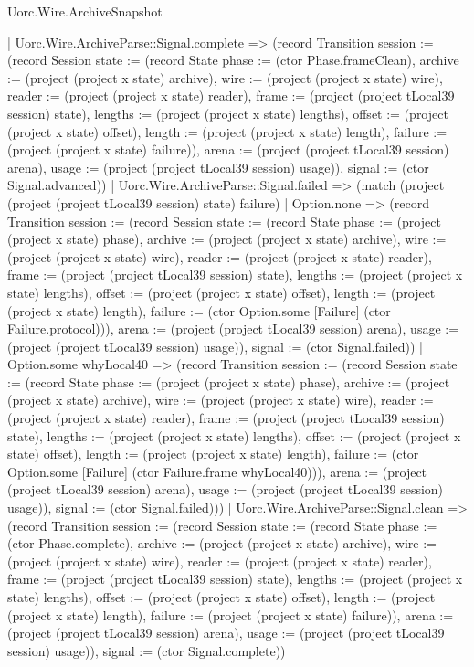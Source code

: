 \begin{lexlean}{Uorc.Wire.ArchiveSnapshot}
\begin{semanticmodule}
{        | Uorc.Wire.ArchiveParse::Signal.complete => (record Transition {session := (record Session {state := (record State {phase := (ctor Phase.frameClean), archive := (project (project x state) archive), wire := (project (project x state) wire), reader := (project (project x state) reader), frame := (project (project tLocal39 session) state), lengths := (project (project x state) lengths), offset := (project (project x state) offset), length := (project (project x state) length), failure := (project (project x state) failure)}), arena := (project (project tLocal39 session) arena), usage := (project (project tLocal39 session) usage)}), signal := (ctor Signal.advanced)})
        | Uorc.Wire.ArchiveParse::Signal.failed => (match (project (project (project tLocal39 session) state) failure)
          | Option.none => (record Transition {session := (record Session {state := (record State {phase := (project (project x state) phase), archive := (project (project x state) archive), wire := (project (project x state) wire), reader := (project (project x state) reader), frame := (project (project tLocal39 session) state), lengths := (project (project x state) lengths), offset := (project (project x state) offset), length := (project (project x state) length), failure := (ctor Option.some [Failure] (ctor Failure.protocol))}), arena := (project (project tLocal39 session) arena), usage := (project (project tLocal39 session) usage)}), signal := (ctor Signal.failed)})
          | Option.some whyLocal40 => (record Transition {session := (record Session {state := (record State {phase := (project (project x state) phase), archive := (project (project x state) archive), wire := (project (project x state) wire), reader := (project (project x state) reader), frame := (project (project tLocal39 session) state), lengths := (project (project x state) lengths), offset := (project (project x state) offset), length := (project (project x state) length), failure := (ctor Option.some [Failure] (ctor Failure.frame whyLocal40))}), arena := (project (project tLocal39 session) arena), usage := (project (project tLocal39 session) usage)}), signal := (ctor Signal.failed)}))
        | Uorc.Wire.ArchiveParse::Signal.clean => (record Transition {session := (record Session {state := (record State {phase := (ctor Phase.complete), archive := (project (project x state) archive), wire := (project (project x state) wire), reader := (project (project x state) reader), frame := (project (project tLocal39 session) state), lengths := (project (project x state) lengths), offset := (project (project x state) offset), length := (project (project x state) length), failure := (project (project x state) failure)}), arena := (project (project tLocal39 session) arena), usage := (project (project tLocal39 session) usage)}), signal := (ctor Signal.complete)})
}
\end{semanticmodule}
\end{lexlean}

